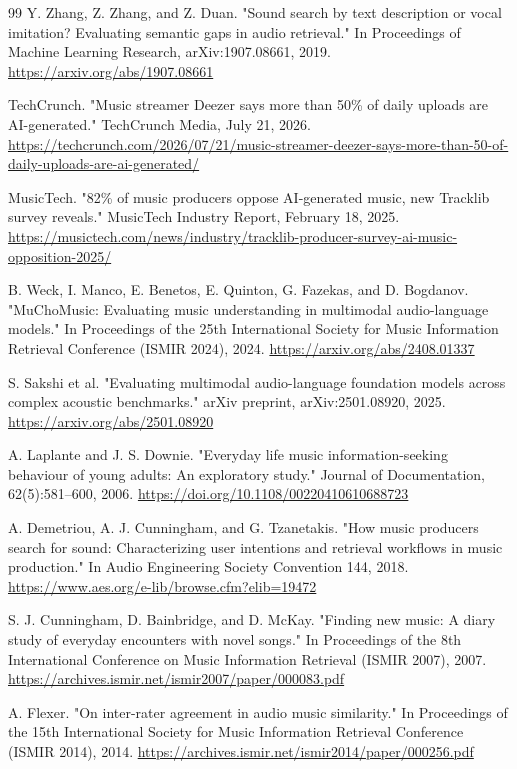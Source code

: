 \begin{thebibliography}{99}
  Y. Zhang, Z. Zhang, and Z. Duan.
  "Sound search by text description or vocal imitation? Evaluating semantic gaps in audio retrieval."
  In Proceedings of Machine Learning Research, arXiv:1907.08661, 2019. \url{https://arxiv.org/abs/1907.08661}

  TechCrunch.
  "Music streamer Deezer says more than 50\% of daily uploads are AI-generated."
  TechCrunch Media, July 21, 2026. \url{https://techcrunch.com/2026/07/21/music-streamer-deezer-says-more-than-50-of-daily-uploads-are-ai-generated/}

  MusicTech.
  "82\% of music producers oppose AI-generated music, new Tracklib survey reveals."
  MusicTech Industry Report, February 18, 2025. \url{https://musictech.com/news/industry/tracklib-producer-survey-ai-music-opposition-2025/}

  B. Weck, I. Manco, E. Benetos, E. Quinton, G. Fazekas, and D. Bogdanov.
  "MuChoMusic: Evaluating music understanding in multimodal audio-language models."
  In Proceedings of the 25th International Society for Music Information Retrieval Conference (ISMIR 2024), 2024. \url{https://arxiv.org/abs/2408.01337}

  S. Sakshi et al.
  "Evaluating multimodal audio-language foundation models across complex acoustic benchmarks."
  arXiv preprint, arXiv:2501.08920, 2025. \url{https://arxiv.org/abs/2501.08920}

  A. Laplante and J. S. Downie.
  "Everyday life music information-seeking behaviour of young adults: An exploratory study."
  Journal of Documentation, 62(5):581--600, 2006. \url{https://doi.org/10.1108/00220410610688723}

  A. Demetriou, A. J. Cunningham, and G. Tzanetakis.
  "How music producers search for sound: Characterizing user intentions and retrieval workflows in music production."
  In Audio Engineering Society Convention 144, 2018. \url{https://www.aes.org/e-lib/browse.cfm?elib=19472}

  S. J. Cunningham, D. Bainbridge, and D. McKay.
  "Finding new music: A diary study of everyday encounters with novel songs."
  In Proceedings of the 8th International Conference on Music Information Retrieval (ISMIR 2007), 2007. \url{https://archives.ismir.net/ismir2007/paper/000083.pdf}

  A. Flexer.
  "On inter-rater agreement in audio music similarity."
  In Proceedings of the 15th International Society for Music Information Retrieval Conference (ISMIR 2014), 2014. \url{https://archives.ismir.net/ismir2014/paper/000256.pdf}


\end{thebibliography}
